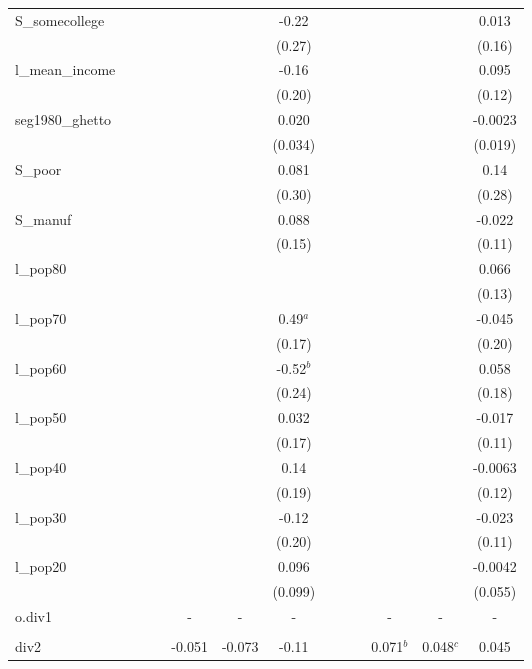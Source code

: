 \documentclass[]{article}
\begin{document}
\begin{tabular}{lcccccccccccc}
S\_somecollege &  &  &  &  &  & -0.22 &  &  &  &  &  & 0.013 \\
 &  &  &  &  &  & (0.27) &  &  &  &  &  & (0.16) \\
l\_mean\_income &  &  &  &  &  & -0.16 &  &  &  &  &  & 0.095 \\
 &  &  &  &  &  & (0.20) &  &  &  &  &  & (0.12) \\
seg1980\_ghetto &  &  &  &  &  & 0.020 &  &  &  &  &  & -0.0023 \\
 &  &  &  &  &  & (0.034) &  &  &  &  &  & (0.019) \\
S\_poor &  &  &  &  &  & 0.081 &  &  &  &  &  & 0.14 \\
 &  &  &  &  &  & (0.30) &  &  &  &  &  & (0.28) \\
S\_manuf &  &  &  &  &  & 0.088 &  &  &  &  &  & -0.022 \\
 &  &  &  &  &  & (0.15) &  &  &  &  &  & (0.11) \\
l\_pop80 &  &  &  &  &  &  &  &  &  &  &  & 0.066 \\
 &  &  &  &  &  &  &  &  &  &  &  & (0.13) \\
l\_pop70 &  &  &  &  &  & 0.49$^a$ &  &  &  &  &  & -0.045 \\
 &  &  &  &  &  & (0.17) &  &  &  &  &  & (0.20) \\
l\_pop60 &  &  &  &  &  & -0.52$^b$ &  &  &  &  &  & 0.058 \\
 &  &  &  &  &  & (0.24) &  &  &  &  &  & (0.18) \\
l\_pop50 &  &  &  &  &  & 0.032 &  &  &  &  &  & -0.017 \\
 &  &  &  &  &  & (0.17) &  &  &  &  &  & (0.11) \\
l\_pop40 &  &  &  &  &  & 0.14 &  &  &  &  &  & -0.0063 \\
 &  &  &  &  &  & (0.19) &  &  &  &  &  & (0.12) \\
l\_pop30 &  &  &  &  &  & -0.12 &  &  &  &  &  & -0.023 \\
 &  &  &  &  &  & (0.20) &  &  &  &  &  & (0.11) \\
l\_pop20 &  &  &  &  &  & 0.096 &  &  &  &  &  & -0.0042 \\
 &  &  &  &  &  & (0.099) &  &  &  &  &  & (0.055) \\
o.div1 &  &  &  & - & - & - &  &  &  & - & - & - \\
 &  &  &  &  &  &  &  &  &  &  &  &  \\
div2 &  &  &  & -0.051 & -0.073 & -0.11 &  &  &  & 0.071$^b$ & 0.048$^c$ & 0.045 \\

\end{tabular}
\end{document}
